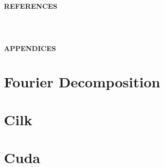 \documentclass{article}
\begin{document}
\pagebreak
\thispagestyle{empty}
\begin{huge}\noindent \textbf{REFERENCES}\end{huge}\\\\


\clearpage
{}%
\renewcommand*{\thepage}{\ref{theoryAppendix}\arabic{page}}

\begin{huge}\noindent \textbf{APPENDICES}\end{huge}

\appendix
\section{Fourier Decomposition}
\label{theoryAppendix}


\newpage
\clearpage
{}%
\renewcommand*{\thepage}{\ref{cilkAppendix}\arabic{page}}
\section{Cilk}
\label{cilkAppendix}


\newpage
\clearpage
{}%
\renewcommand*{\thepage}{\ref{cudaAppendix}\arabic{page}}
\section{Cuda}
\label{cudaAppendix}

\end{document}
